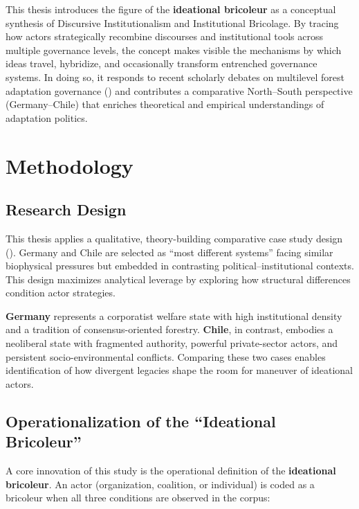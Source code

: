 This thesis introduces the figure of the \textbf{ideational bricoleur} as a 
conceptual synthesis of Discursive Institutionalism and Institutional Bricolage. 
By tracing how actors strategically recombine discourses and institutional tools 
across multiple governance levels, the concept makes visible the mechanisms by 
which ideas travel, hybridize, and occasionally transform entrenched governance 
systems. In doing so, it responds to recent scholarly debates on multilevel forest 
adaptation governance (\citealp{KleinschmitChiassonPulzl2023,Kleinschmit2024}) and 
contributes a comparative North–South perspective (Germany–Chile) that enriches 
theoretical and empirical understandings of adaptation politics.

\section*{Methodology}

\subsection*{Research Design}
This thesis applies a qualitative, theory-building comparative case study 
design (\citealp{George2005}). Germany and Chile are selected as ``most different systems'' 
facing similar biophysical pressures but embedded in contrasting political–institutional 
contexts. This design maximizes analytical leverage by exploring how structural 
differences condition actor strategies. 

\textbf{Germany} represents a corporatist welfare state with high institutional density 
and a tradition of consensus-oriented forestry. \textbf{Chile}, in contrast, embodies a 
neoliberal state with fragmented authority, powerful private-sector actors, and persistent 
socio-environmental conflicts. Comparing these two cases enables identification of how 
divergent legacies shape the room for maneuver of ideational actors.

\subsection*{Operationalization of the ``Ideational Bricoleur''}
A core innovation of this study is the operational definition of the 
\textbf{ideational bricoleur}. An actor (organization, coalition, or individual) 
is coded as a bricoleur when all three conditions are observed in the corpus:

